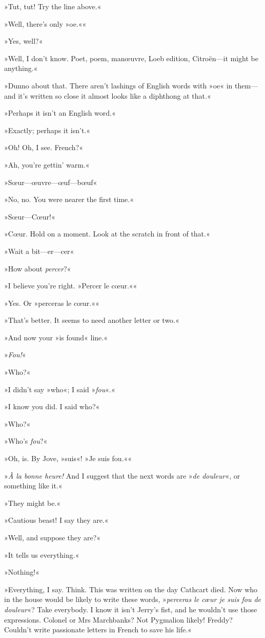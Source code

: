 »Tut, tut! Try the line above.«

»Well, there's only »oe.««

»Yes, well?«

»Well, I don't know. Poet, poem, manœuvre, Loeb edition, Citroën—it might be anything.«

»Dunno about that. There aren't lashings of English words with »oe« in them—and it's written so close it almost looks like a diphthong at that.«

»Perhaps it isn't an English word.«

»Exactly; perhaps it isn't.«

»Oh! Oh, I see. French?«

»Ah, you're gettin' warm.«

»Sœur—œuvre—œuf—bœuf\longdash«

»No, no. You were nearer the first time.«

»Sœur—Cœur!«

»Cœur. Hold on a moment. Look at the scratch in front of that.«

»Wait a bit—er—cer\longdash«

»How about \textit{percer}?«

»I believe you're right. »Percer le cœur.««

»Yes. Or »perceras le cœur.««

»That's better. It seems to need another letter or two.«

»And now your »is found« line.«

»\textit{Fou!}«

»Who?«

»I didn't say »who«; I said »\textit{fou}«.«

»I know you did. I said who?«

»Who?«

»Who's \textit{fou}?«

»Oh, is. By Jove, »suis«! »Je suis fou.««

»\textit{À la bonne heure!} And I suggest that the next words are »\textit{de douleur}«, or something like it.«

»They might be.«

»Cautious beast! I say they are.«

»Well, and suppose they are?«

»It tells us everything.«

»Nothing!«

»Everything, I say. Think. This was written on the day Cathcart died. Now who in the house would be likely to write these words, »\textit{perceras le cœur \textellipsis  je suis fou de douleur}«? Take everybody. I know it isn't Jerry's fist, and he wouldn't use those expressions. Colonel or Mrs Marchbanks? Not Pygmalion likely! Freddy? Couldn't write passionate letters in French to save his life.«

